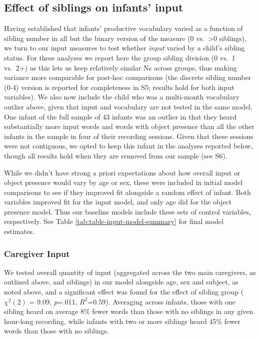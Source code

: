 \documentclass[
  man,mask,floatsintext]{apa6}
\begin{document}
\hypertarget{effect-of-siblings-on-infants-input}{%
\subsection{Effect of siblings on infants' input}\label{effect-of-siblings-on-infants-input}}

Having established that infants' productive vocabulary varied as a function of sibling number in all but the binary version of the measure (0 vs.~\textgreater0 siblings), we turn to our input measures to test whether \emph{input} varied by a child's sibling status. For these analyses we report here the group sibling division (0 vs.~1 vs.~2+) as this lets us keep relatively similar Ns across groups, thus making variance more comparable for post-hoc comparisons (the discrete sibling number (0-4) version is reported for completeness in S5; results hold for both input variables). We also now include the child who was a multi-month vocabulary outlier above, given that input and vocabulary are not tested in the same model. One infant of the full sample of 43 infants was an outlier in that they heard substantially more input words and words with object presence than all the other infants in the sample in four of their recording sessions. Given that these sessions were not contiguous, we opted to keep this infant in the analyses reported below, though all results hold when they are removed from our sample (see S6).

While we didn't have strong a priori expectations about how overall input or object presence would vary by age or sex, these were included in initial model comparisons to see if they improved fit alongside a random effect of infant. Both variables improved fit for the input model, and only age did for the object presence model. Thus our baseline models include these sets of control variables, respectively. See Table \ref{tab:table-input-model-summary} for final model estimates.

\hypertarget{caregiver-input}{%
\subsubsection{Caregiver Input}\label{caregiver-input}}

We tested overall quantity of input (aggregated across the two main caregivers, as outlined above, and siblings) in our model alongside age, sex and subject, as noted above, and a significant effect was found for the effect of sibling group (\(\chi^2 (2)\) = 9.09, \emph{p}=.011, \(R^2\)=0.59). Averaging across infants, those with one sibling heard on average 8\% fewer words than those with no siblings in any given hour-long recording, while infants with two or more siblings heard 45\% fewer words than those with no siblings.
\end{document}
